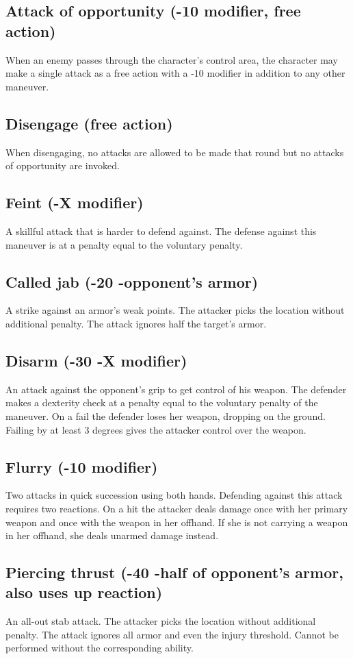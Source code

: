 \documentclass[12pt,a4paper,openany]{book}
\begin{document}
	\subsection*{Attack of opportunity (-10 modifier, free action)}
	When an enemy passes through the character’s control area, the character may make a single attack as a free action with a -10 modifier in addition to any other maneuver.
	\subsection*{Disengage (free action)}
	When disengaging, no attacks are allowed to be made that round but no attacks of opportunity are invoked.
	\subsection*{Feint (-X modifier)}
	A skillful attack that is harder to defend against. The defense against this maneuver is at a penalty equal to the voluntary penalty.
	\subsection*{Called jab (-20 -opponent’s armor)}
	A strike against an armor’s weak points. The attacker picks the location without additional penalty. The attack ignores half the target’s armor.
	\subsection*{Disarm (-30 -X modifier)}
	An attack against the opponent’s grip to get control of his weapon. The defender makes a dexterity check at a penalty equal to the voluntary penalty of the maneuver. On a fail the defender loses her weapon, dropping on the ground. Failing by at least 3 degrees gives the attacker control over the weapon.
	\subsection*{Flurry (-10 modifier)}
	Two attacks in quick succession using both hands. Defending against this attack requires two reactions. On a hit the attacker deals damage once with her primary weapon and once with the weapon in her offhand. If she is not carrying a weapon in her offhand, she deals unarmed damage instead. 
	\subsection*{Piercing thrust (-40 -half of opponent’s armor, also uses up reaction)}
	An all-out stab attack. The attacker picks the location without additional penalty. The attack ignores all armor and even the injury threshold. Cannot be performed without the corresponding ability.
\end{document}
